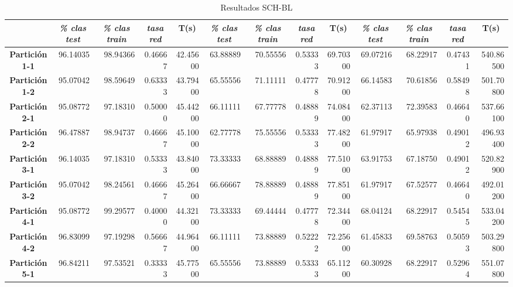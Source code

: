 \documentclass[a4paper,11pt]{article}
\begin{document}
 
 \begin{table}[H]	
  \caption{Resultados SCH-BL}
  \begin{adjustbox}{width=1.1\textwidth}
  \begin{tabular}{|c|r|r|r|r|r|r|r|r|r|r|r|r|}
  \hline
  \multicolumn{1}{|l|}{} & \multicolumn{1}{c|}{\textbf{\textit{\% clas test}}} & \multicolumn{1}{c|}{\textbf{\textit{\% clas train}}} & \multicolumn{1}{c|}{\textbf{\textit{tasa red}}} & \multicolumn{1}{c|}{\textbf{T(s)}} & \multicolumn{1}{c|}{\textbf{\textit{\% clas test}}} & \multicolumn{1}{c|}{\textbf{\textit{\% clas train}}} & \multicolumn{1}{c|}{\textbf{\textit{tasa red}}} & \multicolumn{1}{c|}{\textbf{T(s)}} & \multicolumn{1}{c|}{\textbf{\textit{\% clas test}}} & \multicolumn{1}{c|}{\textbf{\textit{\% clas train}}} & \multicolumn{1}{c|}{\textbf{\textit{tasa red}}} & \multicolumn{1}{c|}{\textbf{T(s)}} \\ \hline
  \textbf{Partición 1-1} & 96.14035 & 98.94366 & 0.46667 & 42.45600 & 63.88889 & 70.55556 & 0.53333 & 69.70300 & 69.07216 & 68.22917 & 0.47431 & 540.86500 \\ \hline
  \textbf{Partición 1-2} & 95.07042 & 98.59649 & 0.63333 & 43.79400 & 65.55556 & 71.11111 & 0.47778 & 70.91200 & 66.14583 & 70.61856 & 0.58498 & 501.70800 \\ \hline
  \textbf{Partición 2-1} & 95.08772 & 97.18310 & 0.50000 & 45.44200 & 66.11111 & 67.77778 & 0.48889 & 74.08400 & 62.37113 & 72.39583 & 0.46640 & 537.66100 \\ \hline
  \textbf{Partición 2-2} & 96.47887 & 98.94737 & 0.46667 & 45.10000 & 62.77778 & 75.55556 & 0.53333 & 77.48200 & 61.97917 & 65.97938 & 0.49012 & 496.93400 \\ \hline
  \textbf{Partición 3-1} & 96.14035 & 97.18310 & 0.53333 & 43.84000 & 73.33333 & 68.88889 & 0.48889 & 77.51000 & 63.91753 & 67.18750 & 0.49012 & 520.82900 \\ \hline
  \textbf{Partición 3-2} & 95.07042 & 98.24561 & 0.46667 & 45.26400 & 66.66667 & 78.88889 & 0.48889 & 77.85100 & 61.97917 & 67.52577 & 0.46640 & 492.01200 \\ \hline
  \textbf{Partición 4-1} & 95.08772 & 99.29577 & 0.40000 & 44.32100 & 73.33333 & 69.44444 & 0.47778 & 72.34400 & 68.04124 & 68.22917 & 0.54545 & 533.04200 \\ \hline
  \textbf{Partición 4-2} & 96.83099 & 97.19298 & 0.56667 & 44.96400 & 66.11111 & 73.88889 & 0.52222 & 72.25600 & 61.45833 & 69.58763 & 0.50593 & 503.29800 \\ \hline
  \textbf{Partición 5-1} & 96.84211 & 97.53521 & 0.33333 & 45.77500 & 65.55556 & 73.88889 & 0.53333 & 65.11200 & 60.30928 & 68.22917 & 0.52964 & 551.07800 \\ \hline

\end{tabular}
\end{adjustbox}
\end{table}
\end{document}
